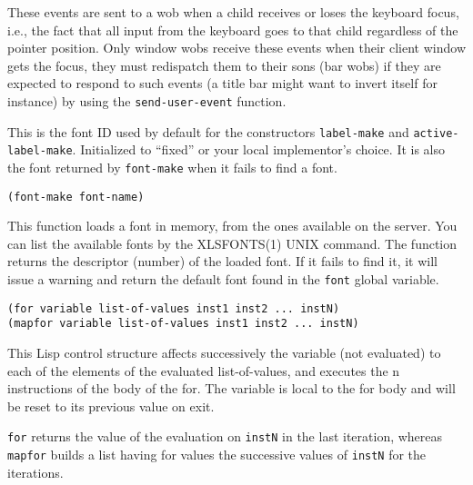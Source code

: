 
These events are sent to a wob when a child receives or loses the keyboard
focus, i.e., the fact that all input from the keyboard goes to that child
regardless of the pointer position. Only window wobs receive these events
when their client window gets the focus,
they must redispatch them to their sons (bar wobs) if they are expected to
respond to such events (a title bar might want to invert itself for instance)
by using the \verb"send-user-event" function.

        

This is the font ID used by default for the
constructors \verb"label-make" and \verb"active-label-make". Initialized to
``fixed'' or your local implementor's choice.
It is also the font returned by \verb"font-make" when it fails to find a font.

        
{\usagefont\begin{verbatim}
(font-make font-name)
\end{verbatim}}\usageupspace

This function loads a font in memory, from the ones available on the server.
You can list the available fonts by the XLSFONTS(1) UNIX command. The function
returns the descriptor (number) of the loaded font. If it fails to find it,
it will issue a warning and return the default font found in the \verb"font"
global variable.

        
{\usagefont\begin{verbatim}
(for variable list-of-values inst1 inst2 ... instN)
(mapfor variable list-of-values inst1 inst2 ... instN)
\end{verbatim}}\usageupspace

This Lisp control structure affects successively the variable (not
evaluated) to each of the elements  of the evaluated list-of-values, and
executes the n instructions of the body of the for.  The variable is local
to the for body and will be reset to its previous value on exit.

\verb"for"  returns the value of the evaluation on \verb"instN" in
the last iteration, whereas \verb"mapfor" builds a list having for
values the successive values of \verb"instN" for the iterations.

